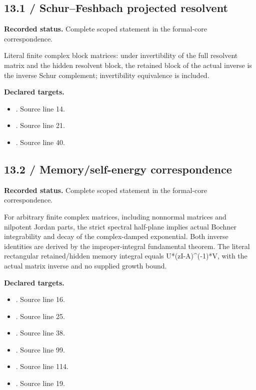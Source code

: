 \subsection{13.1 / Schur--Feshbach projected resolvent}
\label{result:13.1}
\textbf{Recorded status.} Complete scoped statement in the formal-core correspondence.\par
Literal finite complex block matrices: under invertibility of the full resolvent matrix and the hidden resolvent block, the retained block of the actual inverse is the inverse Schur complement; invertibility equivalence is included.

\textbf{Declared targets.}\begin{itemize}
\item {}. Source line 14.
\item {}. Source line 21.
\item {}. Source line 40.
\end{itemize}
\subsection{13.2 / Memory/self-energy correspondence}
\label{result:13.2}
\textbf{Recorded status.} Complete scoped statement in the formal-core correspondence.\par
For arbitrary finite complex matrices, including nonnormal matrices and nilpotent Jordan parts, the strict spectral half-plane implies actual Bochner integrability and decay of the complex-damped exponential. Both inverse identities are derived by the improper-integral fundamental theorem. The literal rectangular retained/hidden memory integral equals U*(zI-A)\textasciicircum{}(-1)*V, with the actual matrix inverse and no supplied growth bound.

\textbf{Declared targets.}\begin{itemize}
\item {}. Source line 16.
\item {}. Source line 25.
\item {}. Source line 38.
\item {}. Source line 99.
\item {}. Source line 114.
\item {}. Source line 19.
\end{itemize}
